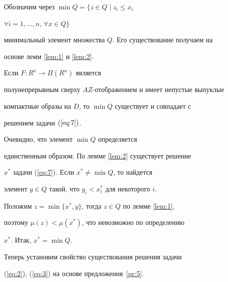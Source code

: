 Обозначим через $\min Q= \{z\in Q \mid z_i \le x_i$


$\forall i=1,\dotsc,n$, $\forall x \in Q\}$


минимальный элемент множества $Q$. Его существование получаем на


основе лемм \ref{lem:1} и \ref{lem:2}.








\begin{props}\label{pr:5}


Если $F: R^n \to \Pi (R^n)$ является


полунепрерывным сверху $AZ$-ото\-бра\-же\-ни\-ем и имеет непустые выпуклые


компактные образы на $D$, то $\min Q$ существует и совпадает с


решением задачи $(\ref{eq:7})$.


\end{props}








\begin{pf}


Очевидно, что элемент $\min Q$ определяется


единственным образом. По лемме \ref{lem:2} существует решение


$x^*$ задачи (\ref{eq:7}). Если $x^* \neq \min Q$, то найдется


элемент $y \in Q$ такой, что $y_i < x^*_i$ для некоторого $i$.


Положим $z=\min\{x^*,y\}$, тогда $z \in Q$ по лемме \ref{lem:1},


поэтому $\mu (z) < \mu (x^*)$, что невозможно по определению


$x^*$. Итак, $x^*=\min Q$.


\end{pf}








Теперь установим свойство существования решения задачи


(\ref{eq:2}), (\ref{eq:3}) на основе предложения~\ref{pr:5}.








